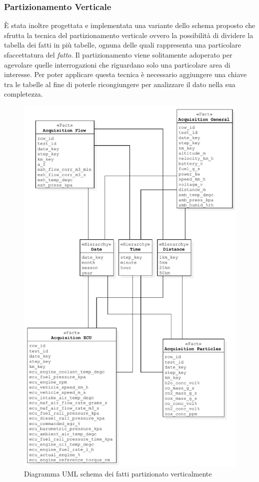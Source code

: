 \subsubsection{Partizionamento Verticale}
È stata inoltre progettata e implementata una variante dello schema proposto che sfrutta la tecnica del partizionamento verticale ovvero la possibilità di dividere la tabella dei fatti in più tabelle, ognuna delle quali rappresenta una particolare sfaccettatura del \textit{fatto}. Il partizionamento viene solitamente adoperato per agevolare quelle interrogazioni che riguardano solo una particolare area di interesse. Per poter applicare questa tecnica è necessario aggiungere una chiave tra le tabelle al fine di poterle ricongiungere per analizzare il dato nella sua completezza.
\begin{figure}[H]
	\centering
	\includegraphics[scale=0.8]{figures/class_fact_scheme_part} %
	\caption{Diagramma UML schema dei fatti partizionato verticalmente}
	\label{fig:ofm}
\end{figure}
\newpage
